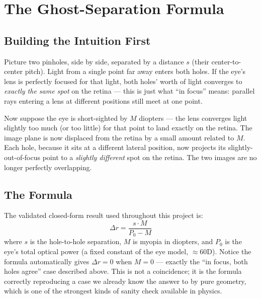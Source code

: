\section{The Ghost-Separation Formula}

\subsection{Building the Intuition First}

Picture two pinholes, side by side, separated by a distance $s$ (their
center-to-center pitch). Light from a single point far away enters both
holes. If the eye's lens is perfectly focused for that light, both holes'
worth of light converges to \emph{exactly the same spot} on the retina ---
this is just what ``in focus'' means: parallel rays entering a lens at
different positions still meet at one point.

Now suppose the eye is short-sighted by $M$ diopters --- the lens converges
light slightly too much (or too little) for that point to land exactly on
the retina. The image plane is now displaced from the retina by a small
amount related to $M$. Each hole, because it sits at a different lateral
position, now projects its slightly-out-of-focus point to a \emph{slightly
different} spot on the retina. The two images are no longer perfectly
overlapping.

\subsection{The Formula}

The validated closed-form result used throughout this project is:
\begin{equation}
\Delta r = \frac{s \cdot M}{P_0 - M}
\end{equation}
where $s$ is the hole-to-hole separation, $M$ is myopia in diopters, and
$P_0$ is the eye's total optical power (a fixed constant of the eye model,
$\approx 60$D). Notice the formula automatically gives $\Delta r = 0$ when
$M=0$ --- exactly the ``in focus, both holes agree'' case described above.
This is not a coincidence; it is the formula correctly reproducing a case we
already know the answer to by pure geometry, which is one of the strongest
kinds of sanity check available in physics.

